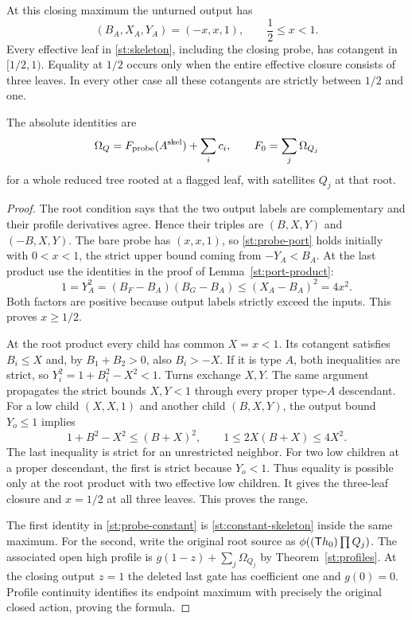 \begin{theorem}\label{st:probe}
At this closing maximum the unturned output has
\begin{equation}\label{st:probe-port}
 (B_A,X_A,Y_A)=(-x,x,1),\qquad \frac12\le x<1.
\end{equation}
Every effective leaf in \eqref{st:skeleton},
including the closing probe, has cotangent in
$[1/2,1)$. Equality at $1/2$ occurs only when
the entire effective closure consists of three
leaves. In every other case all these cotangents
are strictly between $1/2$ and one.

The absolute identities are
\begin{equation}\label{st:probe-constant}
 \Omega_Q=F_{\rm probe}(A^{\rm skel})+\sum_i c_i,
 \qquad F_0=\sum_j\Omega_{Q_j}
\end{equation}
for a whole reduced tree rooted at a flagged leaf,
with satellites $Q_j$ at that root.
\end{theorem}
\begin{proof}
The root condition says that the two output labels
are complementary and their profile derivatives
agree. Hence their triples are $(B,X,Y)$ and
$(-B,X,Y)$. The bare probe has $(x,x,1)$,
so \eqref{st:probe-port} holds initially with
$0<x<1$, the strict upper bound coming from
$-Y_A<B_A$.
At the last product use the identities in the
proof of Lemma~\ref{st:port-product}:
\[
 1=Y_A^2=(B_F-B_A)(B_G-B_A)
             \le(X_A-B_A)^2=4x^2 .
\]
Both factors are positive because output labels
strictly exceed the inputs. This proves $x\ge1/2$.

At the root product every child has common $X=x<1$.
Its cotangent satisfies $B_i\le X$ and, by
$B_1+B_2>0$, also $B_i>-X$.
If it is type $A$, both inequalities are strict,
so $Y_i^2=1+B_i^2-X^2<1$.
Turns exchange $X,Y$. The same argument propagates
the strict bounds $X,Y<1$ through every proper
type-$A$ descendant.
For a low child $(X,X,1)$ and another child
$(B,X,Y)$, the output bound $Y_o\le1$ implies
\begin{equation}\label{st:effective-bound}
 1+B^2-X^2\le(B+X)^2,\qquad
 1\le2X(B+X)\le4X^2.
\end{equation}
The last inequality is strict for an unrestricted
neighbor. For two low children at a proper
descendant, the first is strict because $Y_o<1$.
Thus equality is possible only at the root
product with two effective low children. It
gives the three-leaf closure and $x=1/2$ at
all three leaves. This proves the range.

The first identity in \eqref{st:probe-constant}
is \eqref{st:constant-skeleton} inside the same
maximum. For the second, write the original
root source as $\phi((\mathsf T h_0)\prod Q_j)$.
The associated open high profile is
$g(1-z)+\sum_j\Omega_{Q_j}$ by
Theorem~\ref{st:profiles}. At the closing output
$z=1$ the deleted last gate has coefficient
one and $g(0)=0$. Profile continuity identifies
its endpoint maximum with precisely the original
closed action, proving the formula.
\end{proof}

